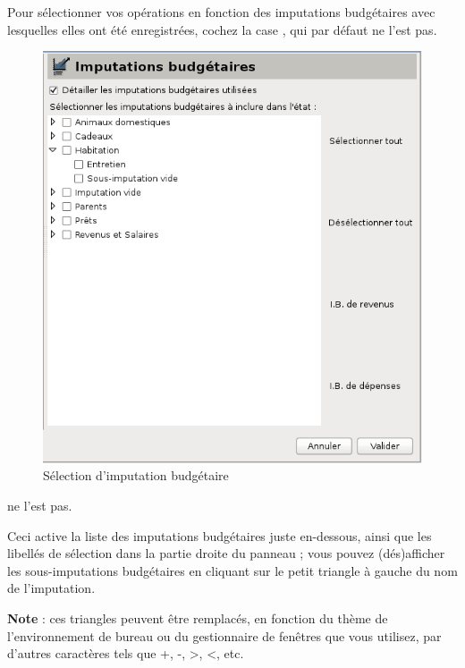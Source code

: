 Pour sélectionner vos opérations en fonction des imputations budgétaires avec lesquelles elles ont été enregistrées, cochez la case , qui par défaut \ifIllustration ne l'est pas.
\begin{figure}[htbp]
\begin{center}
\includegraphics[scale=0.5]{image/screenshot/reportcreation_datas_budgetlines}
\end{center}
\caption{Sélection d'imputation budgétaire}
\label{reportcreation-datas-budgetlines-img}
\end{figure}
\else ne l'est pas.
\fi

Ceci active la liste des imputations budgétaires juste en-dessous, ainsi que les libellés de sélection dans la partie droite du panneau ; vous pouvez (dés)afficher les sous-imputations budgétaires en cliquant sur le petit triangle à gauche du nom de l'imputation.

\textbf{Note} : ces triangles peuvent être remplacés, en fonction du thème de l'environnement de bureau ou du gestionnaire de fenêtres que vous utilisez, par d'autres caractères tels que +, -, >, <, etc.

